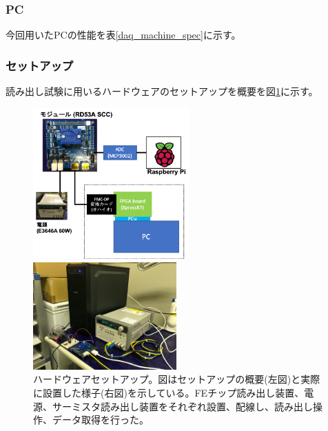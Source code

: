 \subsubsection{PC}
今回用いたPCの性能を表\ref{daq_machine_spec}に示す。
\begin{table}[tbp]
\begin{center}
\caption[読み出しに使用したPCの性能]{読み出しに使用したPCの性能。研究室で所有するPCを使用した。OSはcentOS7である。}
\label{daq_machine_spec}
\end{center}
\end{table}

\subsubsection{セットアップ}
読み出し試験に用いるハードウェアのセットアップを概要を図\ref{readout_setup_overview}に示す。

\begin{figure}[bpt]\centering
  \begin{minipage}{0.5\hsize}
    \includegraphics[width=6cm]{HW_setup}
  \end{minipage}
  \begin{minipage}{0.4\hsize}
    \includegraphics[width=5.5cm]{HW_setup_pic}
  \end{minipage}
\caption[ハードウェアセットアップ]{ハードウェアセットアップ。図はセットアップの概要(左図)と実際に設置した様子(右図)を示している。FEチップ読み出し装置、電源、サーミスタ読み出し装置をそれぞれ設置、配線し、読み出し操作、データ取得を行った。}
\label{readout_setup_overview}
\end{figure}



